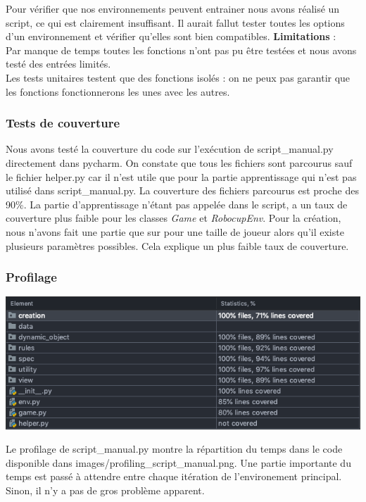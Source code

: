 \documentclass[11pt, a4paper]{article}
\begin{document}
	Pour vérifier que nos environnements peuvent entrainer nous avons réalisé un script, ce qui est clairement insuffisant. Il aurait fallut tester toutes les options d'un environnement et vérifier qu'elles sont bien compatibles.
	\noindent \textbf{Limitations }: \\
	Par manque de temps toutes les fonctions n'ont pas pu être testées et nous avons testé des entrées limités. \\
	Les tests unitaires testent que des fonctions isolés : on ne peux pas garantir que les fonctions fonctionnerons les unes avec les autres.

	\subsubsection{Tests de couverture}
	Nous avons testé la couverture du code sur l'exécution de script\_manual.py directement dans pycharm. On constate que tous les fichiers sont
	parcourus sauf le fichier helper.py car il n'est utile que pour la partie apprentissage qui n'est pas utilisé
	dans script\_manual.py. La couverture des fichiers parcourus est proche des 90\%. La partie d'apprentissage n'étant pas
	appelée dans le script, a un taux de couverture plus faible pour les classes \textit{Game} et \textit{RobocupEnv}.
	Pour la création, nous n'avons fait une partie que sur pour une taille de joueur alors qu'il existe plusieurs paramètres
	possibles. Cela explique un plus faible taux de couverture.


	\subsubsection{Profilage}
	\includegraphics[scale=0.5]{images/coverage_script_manual.png}

	Le profilage de script\_manual.py montre la répartition du temps dans le code disponible dans images/profiling\_script\_manual.png. Une partie importante du temps est
	passé à attendre entre chaque itération de l'environement principal. Sinon, il n'y a pas de gros problème apparent.\\
\end{document}
